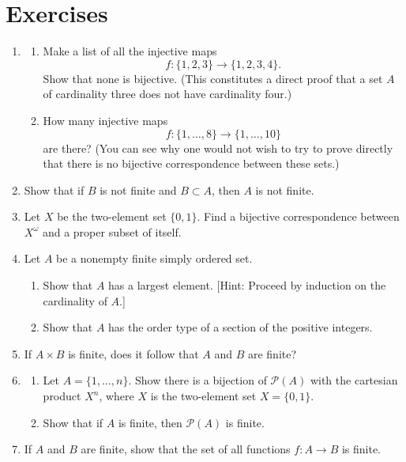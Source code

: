 \section*{Exercises}
\begin{enumerate}[itemsep=0.4em, parsep=0pt, topsep=0pt, partopsep=0pt, leftmargin=*, label=\arabic*., ref=\arabic*]
\item
  \begin{enumerate}[itemsep=0.2em, parsep=0pt, topsep=0pt, partopsep=0pt, leftmargin=*, label=(\alph*), align=left]
  \item Make a list of all the injective maps \[ f : \{1,2,3\} \rightarrow \{1,2,3,4\}. \] Show that none is bijective. (This constitutes a direct proof that a set \(A\) of cardinality three does not have cardinality four.)
  \item How many injective maps \[ f : \{1,\ldots, 8\} \rightarrow \{1,\ldots ,{10}\} \] are there? (You can see why one would not wish to try to prove directly that there is no bijective correspondence between these sets.)
  \end{enumerate}
\item Show that if \(B\) is not finite and \(B \subset A\), then \(A\) is not finite.
\item Let \(X\) be the two-element set \(\{ 0,1\}\). Find a bijective correspondence between \(X^{\omega }\) and a proper subset of itself.
\item Let \(A\) be a nonempty finite simply ordered set.
  \begin{enumerate}[itemsep=0.2em, parsep=0pt, topsep=0pt, partopsep=0pt, leftmargin=*, label=(\alph*), align=left]
  \item Show that \(A\) has a largest element. [Hint: Proceed by induction on the cardinality of \(A\).]
  \item Show that \(A\) has the order type of a section of the positive integers.
  \end{enumerate}
\item If \(A \times B\) is finite, does it follow that \(A\) and \(B\) are finite?
\item
  \begin{enumerate}[itemsep=0.2em, parsep=0pt, topsep=0pt, partopsep=0pt, leftmargin=*, label=(\alph*), align=left]
  \item Let \(A = \{1,\ldots, n\}\). Show there is a bijection of \(\mathcal{P}(A)\) with the cartesian product \(X^{n}\), where \(X\) is the two-element set \(X = \{ 0,1\}\).
  \item Show that if \(A\) is finite, then \(\mathcal{P}(A)\) is finite.
  \end{enumerate}
\item If \(A\) and \(B\) are finite, show that the set of all functions \(f : A \rightarrow B\) is finite.
\end{enumerate}

